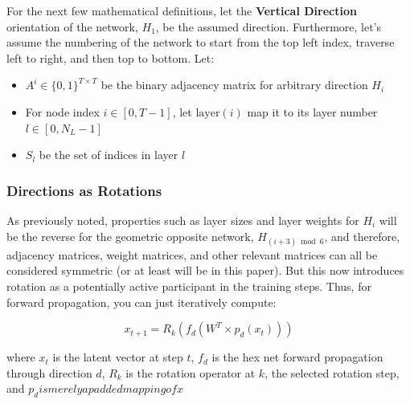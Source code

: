
For the next few mathematical definitions, let the \textbf{Vertical Direction} orientation of the network, $H_1$, be the assumed direction.
Furthermore, let's assume the numbering of the network to start from the top left index, traverse left to right, and then top to bottom.
Let:
\begin{itemize}
    \item $A^{i} \in \{0, 1\}^{T \times T}$ be the binary adjacency matrix for arbitrary direction $H_i$
    \item For node index $i \in [0, T-1]$, let $\mathrm{layer}(i)$ map it to its layer number $l \in [0, N_{L}-1]$
    \item $S_{l}$ be the set of indices in layer $l$
\end{itemize}


\subsubsection{Directions as Rotations}
As previously noted, properties such as layer sizes and layer weights for $H_i$ will be the reverse for the geometric opposite network, $H_{(i+3) \bmod 6}$, and therefore, adjacency matrices, weight matrices, and other relevant matrices can all be considered symmetric (or at least will be in this paper).
But this now introduces rotation as a potentially active participant in the training steps.
Thus, for forward propagation, you can just iteratively compute:

\[x_{t+1} = R_k(f_d(W^T \times p_d(x_t)))\]

where $x_t$ is the latent vector at step $t$, $f_d$ is the hex net forward propagation through direction $d$, $R_k$ is the rotation operator at $k$, the selected rotation step, and $p_d is merely a padded mapping of x$


